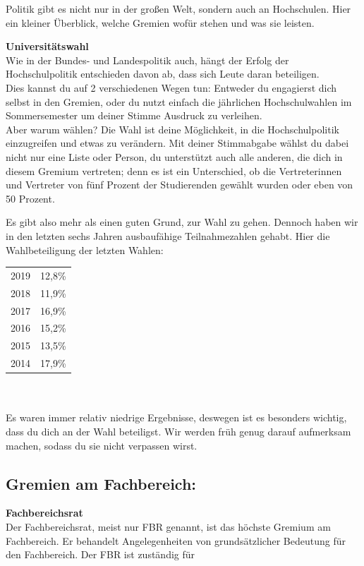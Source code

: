 {Politik gibt es nicht nur in der großen Welt, sondern auch an Hochschulen. Hier ein kleiner Überblick, welche Gremien wofür stehen und was sie leisten.
}{
    \noindent\textbf{Universitätswahl}\\
    Wie in der Bundes- und Landespolitik auch, hängt der Erfolg der Hochschulpolitik entschieden davon ab, dass sich Leute daran beteiligen.\\
    Dies kannst du auf 2 verschiedenen Wegen tun: Entweder du engagierst dich selbst in den Gremien, oder du nutzt einfach die jährlichen Hochschulwahlen im Sommersemester um deiner Stimme Ausdruck zu verleihen.\\
    Aber warum wählen? Die Wahl ist deine Möglichkeit, in die Hochschulpolitik einzugreifen und etwas zu verändern. Mit deiner Stimmabgabe wählst du dabei nicht nur eine Liste oder Person, du unterstützt auch alle anderen, die dich in diesem Gremium vertreten; denn es ist ein Unterschied, ob die Vertreterinnen und Vertreter von fünf Prozent der Studierenden gewählt wurden oder eben von 50 Prozent.

    Es gibt also mehr als einen guten Grund, zur Wahl zu gehen. Dennoch haben wir in den letzten sechs Jahren ausbaufähige Teilnahmezahlen gehabt. Hier die Wahlbeteiligung der letzten Wahlen:\\

    \begin{tabular}{ll}
        2019 & 12,8\% \\
        2018 & 11,9\% \\
        2017 & 16,9\% \\
        2016 & 15,2\% \\
        2015 & 13,5\% \\
        2014 & 17,9\% \\
    \end{tabular}
    \\\\
    Es waren immer relativ niedrige Ergebnisse, deswegen ist es besonders wichtig, dass du dich an der Wahl beteiligst. Wir werden früh genug darauf aufmerksam machen, sodass du sie nicht verpassen wirst.

    \noindent
    \subsection*{Gremien am Fachbereich:}
    \textbf{Fachbereichsrat}\\
    Der Fachbereichsrat, meist nur FBR genannt, ist das höchste Gremium am Fachbereich. Er behandelt Angelegenheiten von grundsätzlicher Bedeutung für den Fachbereich. Der FBR ist zuständig für

}
